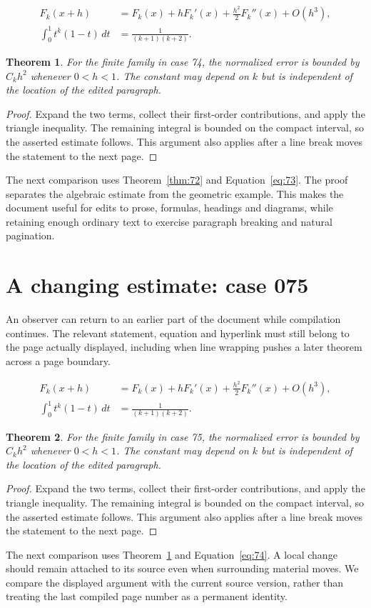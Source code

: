 \documentclass[a4paper,10pt]{article}
\newtheorem{theorem}{Theorem}[section]
\begin{document}
\lipsum[10-11]
\begin{align}\label{eq:73}
 F_k(x+h)&=F_k(x)+hF_k'(x)+\frac{h^2}{2}F_k''(x)+O(h^3),\\
 \int_0^1 t^k(1-t)\,dt&=\frac{1}{(k+1)(k+2)}.
\end{align}
\begin{theorem}\label{thm:73}
For the finite family in case 74, the normalized error is bounded by $C_k h^2$ whenever $0<h<1$. The constant may depend on $k$ but is independent of the location of the edited paragraph.
\end{theorem}
\begin{proof}
Expand the two terms, collect their first-order contributions, and apply the
triangle inequality. The remaining integral is bounded on the compact interval,
so the asserted estimate follows. This argument also applies after a line break
moves the statement to the next page.
\end{proof}
The next comparison uses Theorem~\ref{thm:72} and Equation~\ref{eq:73}. The proof separates the algebraic estimate from the geometric example. This makes the document useful for edits to prose, formulas, headings and diagrams, while retaining enough ordinary text to exercise paragraph breaking and natural pagination.

\lipsum[18]

\section{A changing estimate: case 075}\label{unit:74}
An observer can return to an earlier part of the document while compilation continues. The relevant statement, equation and hyperlink must still belong to the page actually displayed, including when line wrapping pushes a later theorem across a page boundary.

\lipsum[13-14]
\begin{align}\label{eq:74}
 F_k(x+h)&=F_k(x)+hF_k'(x)+\frac{h^2}{2}F_k''(x)+O(h^3),\\
 \int_0^1 t^k(1-t)\,dt&=\frac{1}{(k+1)(k+2)}.
\end{align}
\begin{theorem}\label{thm:74}
For the finite family in case 75, the normalized error is bounded by $C_k h^2$ whenever $0<h<1$. The constant may depend on $k$ but is independent of the location of the edited paragraph.
\end{theorem}
\begin{proof}
Expand the two terms, collect their first-order contributions, and apply the
triangle inequality. The remaining integral is bounded on the compact interval,
so the asserted estimate follows. This argument also applies after a line break
moves the statement to the next page.
\end{proof}
The next comparison uses Theorem~\ref{thm:73} and Equation~\ref{eq:74}. A local change should remain attached to its source even when surrounding material moves. We compare the displayed argument with the current source version, rather than treating the last compiled page number as a permanent identity.
\end{document}
